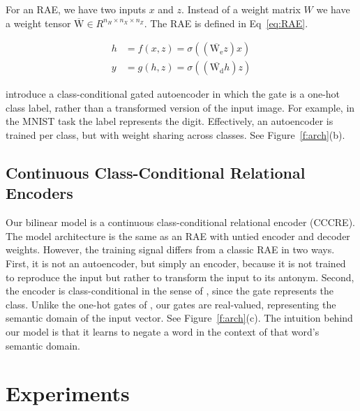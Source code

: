 \documentclass[11pt]{article}
\begin{document}
\noindent For an RAE, we have two inputs $x$ and $z$. Instead of a weight matrix $W$ we have a weight tensor $\overline{\mathrm{W}} \in R^{n_H \times n_X \times n_Z}$.  The RAE is defined in Eq~\ref{eq:RAE}.

\vspace{-7mm}
\begin{equation}
\begin{split}
h & = f(x, z) = \sigma ((\overline{\mathrm{W_e}}z)x) \\
y & = g(h, z) = \sigma ((\overline{\mathrm{W_d}}h)z)
\end{split}
\label{eq:RAE}
\end{equation}
\vspace{-5mm}

\citet{rudy:15} introduce a class-conditional gated autoencoder in which the gate is a one-hot class label, rather than a transformed version of the input image. For example, in the MNIST task the label represents the digit. Effectively, an autoencoder is trained per class, but with weight sharing across classes. See Figure~\ref{f:arch}(b).

\subsection{Continuous Class-Conditional Relational Encoders}

Our bilinear model is a continuous class-conditional relational encoder (CCCRE). The model architecture is the same as an RAE with untied encoder and decoder weights. However, the training signal differs from a classic RAE in two ways. First, it is not an autoencoder, but simply an encoder, because it is not trained to reproduce the input but rather to transform the input to its antonym. Second, the encoder is class-conditional in the sense of \cite{rudy:15}, since the gate represents the class.
Unlike the one-hot gates of \cite{rudy:15}, our gates are real-valued, representing the semantic domain of the input vector. See Figure~\ref{f:arch}(c). The intuition behind our model is that it learns to negate a word in the context of that word's semantic domain.

\section{Experiments}
\end{document}
